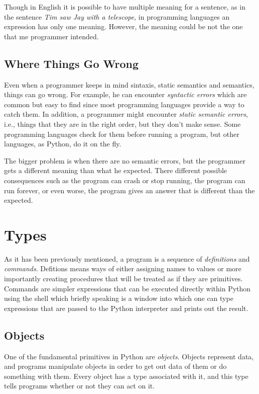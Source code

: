 \documentclass[a4paper]{article}
\begin{document}
Though in English it is possible to have multiple meaning for a sentence,
as in the sentence \textit{Tim saw Jay with a telescope}, in programming
languages an expression has only one meaning. However, the meaning could be not
the one that me programmer intended.

\subsection{Where Things Go Wrong}

Even when a programmer keeps in mind sintaxis, static semantics and semantics,
things can go wrong. For example, he can encounter \textit{syntactic errors}
which are common but easy to find since most programming languages provide a
way to catch them. In addition, a programmer might encounter \textit{static
semantic errors}, i.e., things that they are in the right order, but they
don't make sense. Some programming languages check for them before running a
program, but other languages, as Python, do it on the fly.

The bigger problem is when there are no semantic errors, but the programmer
gets a different meaning than what he expected. There different possible
consequences such as the program can crash or stop running, the program can
run forever, or even worse, the program gives an answer that is different than
the expected.

\section{Types}

As it has been previously mentioned, a program is a sequence of \textit{
definitions} and \textit{commands}. Defitions means ways of either assigning
names to values or more importantly creating procedures that will be treated
as if they are primitives. Commands are simpler expressions that can be
executed directly within Python using the shell which briefly speaking is a
window into which one can type expressions that are passed to the Python
interpreter and prints out the result.

\subsection{Objects}
One of the fundamental primitives in Python are \textit{objects}. Objects
represent data, and programs manipulate objects in order to get out data of
them or do something with them. Every object has a type associated with it,
and this type tells programs whether or not they can act on it.
\end{document}
